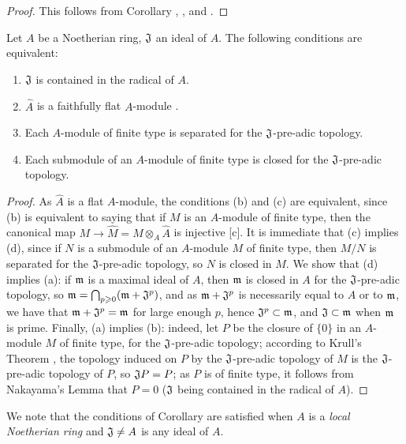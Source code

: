 \begin{proof}
\label{proof-0.7.3.4}
This follows from Corollary , ,
and .
\end{proof}

\begin{cor}[7.3.5]
\label{0.7.3.5}
Let $A$ be a Noetherian ring, $\mathfrak{J}$ an ideal of $A$. The following conditions are
equivalent:
\begin{enumerate}[label={\rm(\alph*)}]
  \item $\mathfrak{J}$ is contained in the radical of $A$.
  \item $\widehat{A}$ is a faithfully flat $A$-module .
  \item Each $A$-module of finite type is separated for the $\mathfrak{J}$-pre-adic topology.
  \item Each submodule of an $A$-module of finite type is closed for the $\mathfrak{J}$-pre-adic topology.
\end{enumerate}
\end{cor}

\begin{proof}
\label{proof-0.7.3.5}
As $\widehat{A}$ is a flat $A$-module, the conditions (b) and (c) are equivalent, since
(b) is equivalent to saying that if $M$ is an $A$-module of finite type, then the canonical
map $M\to\widehat{M}=M\otimes_A\widehat{A}$ is injective [c].
It is immediate that (c) implies (d), since if $N$ is a submodule of an $A$-module $M$ of
finite type, then $M/N$ is separated for the $\mathfrak{J}$-pre-adic topology, so $N$ is
closed in $M$. We show that (d) implies (a): if $\mathfrak{m}$ is a maximal ideal of $A$,
then $\mathfrak{m}$ is closed in $A$ for the $\mathfrak{J}$-pre-adic topology, so
$\mathfrak{m}=\bigcap_{p\geqslant 0}(\mathfrak{m}+\mathfrak{J}^p)$, and as
$\mathfrak{m}+\mathfrak{J}^p$ is necessarily equal to $A$ or to $\mathfrak{m}$, we have that
$\mathfrak{m}+\mathfrak{J}^p=\mathfrak{m}$ for large enough $p$,
hence $\mathfrak{J}^p\subset\mathfrak{m}$, and $\mathfrak{J}\subset\mathfrak{m}$ when
$\mathfrak{m}$ is prime. Finally, (a) implies (b): indeed, let $P$ be the closure of $\{0\}$
in an $A$-module $M$ of finite type, for the $\mathfrak{J}$-pre-adic topology; according to
Krull's Theorem , the topology induced on $P$ by the
$\mathfrak{J}$-pre-adic topology of $M$ is the $\mathfrak{J}$-pre-adic topology of $P$,
so $\mathfrak{J}P=P$; as $P$ is of finite type, it follows from Nakayama's Lemma that
$P=0$ ($\mathfrak{J}$ being contained in the radical of $A$).
\end{proof}

We note that the conditions of Corollary  are satisfied
when $A$ is a {\em local Noetherian ring} and $\mathfrak{J}\neq A$ is any ideal of $A$.

